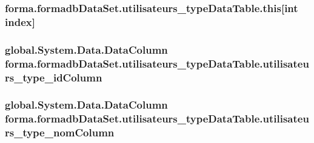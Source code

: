 \subsubsection[{\texorpdfstring{this[int index]}{this[int index]}}]{ forma.\+formadb\+Data\+Set.\+utilisateurs\+\_\+type\+Data\+Table.\+this\mbox{[}int index\mbox{]}\hspace{0.3cm}{\ttfamily [get]}}\hypertarget{classforma_1_1formadb_data_set_1_1utilisateurs__type_data_table_a0c12b1bec621d01c9560fbcf0b794790}{}\label{classforma_1_1formadb_data_set_1_1utilisateurs__type_data_table_a0c12b1bec621d01c9560fbcf0b794790}
\subsubsection[{\texorpdfstring{utilisateurs\+\_\+type\+\_\+id\+Column}{utilisateurs_type_idColumn}}]{\setlength{\rightskip}{0pt plus 5cm}global.\+System.\+Data.\+Data\+Column forma.\+formadb\+Data\+Set.\+utilisateurs\+\_\+type\+Data\+Table.\+utilisateurs\+\_\+type\+\_\+id\+Column\hspace{0.3cm}{\ttfamily [get]}}\hypertarget{classforma_1_1formadb_data_set_1_1utilisateurs__type_data_table_a380f598143cd7d3549799af7fa6fd5eb}{}\label{classforma_1_1formadb_data_set_1_1utilisateurs__type_data_table_a380f598143cd7d3549799af7fa6fd5eb}
\subsubsection[{\texorpdfstring{utilisateurs\+\_\+type\+\_\+nom\+Column}{utilisateurs_type_nomColumn}}]{\setlength{\rightskip}{0pt plus 5cm}global.\+System.\+Data.\+Data\+Column forma.\+formadb\+Data\+Set.\+utilisateurs\+\_\+type\+Data\+Table.\+utilisateurs\+\_\+type\+\_\+nom\+Column\hspace{0.3cm}{\ttfamily [get]}}\hypertarget{classforma_1_1formadb_data_set_1_1utilisateurs__type_data_table_a3016a5d31607bd898c35f7227cc04d40}{}\label{classforma_1_1formadb_data_set_1_1utilisateurs__type_data_table_a3016a5d31607bd898c35f7227cc04d40}


